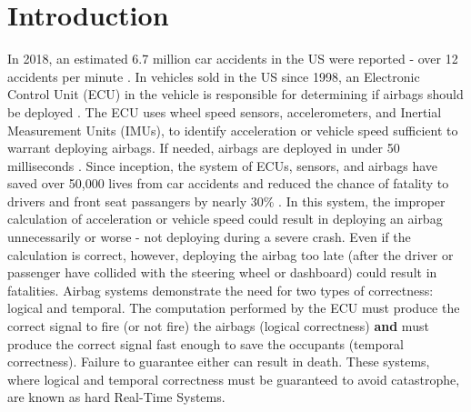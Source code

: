 \section{Introduction}   \label{chap:introduction}

In 2018, an estimated 6.7 million car accidents in the US were reported - over 12 accidents per minute \cite{national_highway_traffic_safety_administration_traffic_nodate}.
In vehicles sold in the US since 1998, an Electronic Control Unit (ECU) in the vehicle is responsible for determining if airbags should be deployed \cite{insurance_institute_for_highway_safety_airbags_nodate}.
The ECU uses wheel speed sensors, accelerometers, and Inertial Measurement Units (IMUs), to identify acceleration or vehicle speed sufficient to warrant deploying airbags. 
If needed, airbags are deployed in under 50 milliseconds \cite{national_highway_traffic_safety_administration_air_2016}.
Since inception, the system of ECUs, sensors, and airbags have saved over 50,000 lives from car accidents and reduced the chance of fatality to drivers and front seat passangers by nearly 30\% \cite{insurance_institute_for_highway_safety_airbags_nodate}.
In this system, the improper calculation of acceleration or vehicle speed could result in deploying an airbag unnecessarily or worse - not deploying during a severe crash.
Even if the calculation is correct, however, deploying the airbag too late (after the driver or passenger have collided with the steering wheel or dashboard) could result in fatalities.
Airbag systems demonstrate the need for two types of correctness: logical and temporal.
The computation performed by the ECU must produce the correct signal to fire (or not fire) the airbags (logical correctness) \textbf{and} must produce the correct signal fast enough to save the occupants (temporal correctness).
Failure to guarantee either can result in death.
These systems, where logical and temporal correctness must be guaranteed to avoid catastrophe, are known as hard Real-Time Systems.

